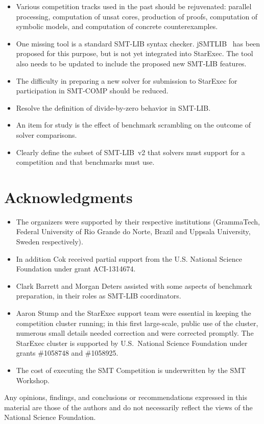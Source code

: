 \documentclass[twoside,11pt]{article}
\begin{document}
\begin{itemize}
\item Various competition tracks used in the past should be rejuvenated: parallel processing, computation of unsat cores, production of proofs, computation of symbolic models, and computation of concrete counterexamples.
\item One missing tool is a standard SMT-LIB syntax checker. jSMTLIB~\cite{cok2011jsmtlib} has been proposed for this purpose, but is not yet integrated into StarExec. The tool also needs to be updated to include the proposed new SMT-LIB features.
\item The difficulty in preparing a new solver for submission to StarExec for participation in SMT-COMP should be reduced.
\item Resolve the definition of divide-by-zero behavior in SMT-LIB.
\item An item for study is the effect of benchmark scrambling on the outcome of solver comparisons.
\item Clearly define the subset of SMT-LIB~v2 that solvers must support for a competition and that benchmarks must use.
\end{itemize}


\section*{Acknowledgments} 
\begin{itemize}
\item The organizers were supported by their respective institutions (GrammaTech, Federal University of Rio Grande do Norte, Brazil and Uppsala University, Sweden respectively). 

\item In addition Cok received partial support from the U.S. National Science Foundation
under grant ACI-1314674.

\item Clark Barrett and Morgan Deters assisted with some aspects of benchmark preparation,
in their roles as SMT-LIB coordinators.

\item Aaron Stump and the StarExec support team were essential in keeping the competition cluster running;
in this first large-scale, public use of the cluster, numerous small details needed correction and were corrected promptly.
%
The StarExec cluster is supported by 
U.S.\ National Science Foundation under grants \#1058748 and \#1058925.
%
\item The cost of executing the SMT Competition is underwritten by the SMT Workshop. 
\end{itemize}

Any opinions,
findings, and conclusions or recommendations expressed in this
material are those of the authors and do not necessarily reflect the
views of the National Science Foundation.



\end{document}

